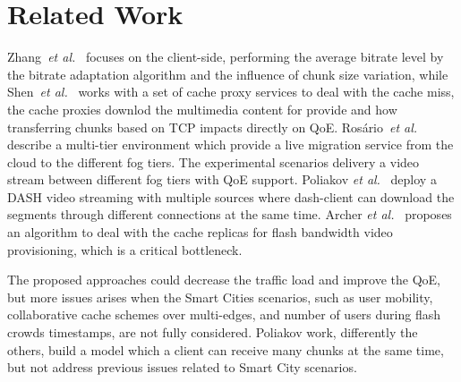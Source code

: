 \section*{Related Work}
\label{sec:releated-work}

Zhang~\textit{et al.}~\cite{zhangINFOCOM17} focuses on the client-side, performing the average bitrate level by the bitrate adaptation algorithm and the influence of chunk size variation, while Shen~\textit{et al.}~\cite{shenIWQoS19} works with a set of cache proxy services to deal with the cache miss, the cache proxies downlod the multimedia content for provide and how transferring chunks based on TCP impacts directly on QoE. Rosário~\textit{et al.}~\cite{rosarioSENSORS2018} describe a multi-tier environment which provide a live migration service from the cloud to the different fog tiers. The experimental scenarios delivery a video stream between different fog tiers with QoE support.
Poliakov \textit{et al.}~\cite{poliakovPHD2018} deploy a DASH video streaming with multiple  sources where dash-client can download the segments through different connections at the same time.
Archer \textit{et al.}~\cite{archerGoogleJournal2019} proposes an algorithm to deal with the cache replicas for flash bandwidth video provisioning, which is a critical bottleneck.

The proposed approaches could decrease the traffic load and improve the QoE, but more issues arises when the Smart Cities scenarios, such as user mobility, collaborative cache schemes over multi-edges, and number of users during flash crowds timestamps, are not fully considered. Poliakov work, differently the others, build a model which a client can receive many chunks at the same time, but not address previous issues related to Smart City scenarios.




